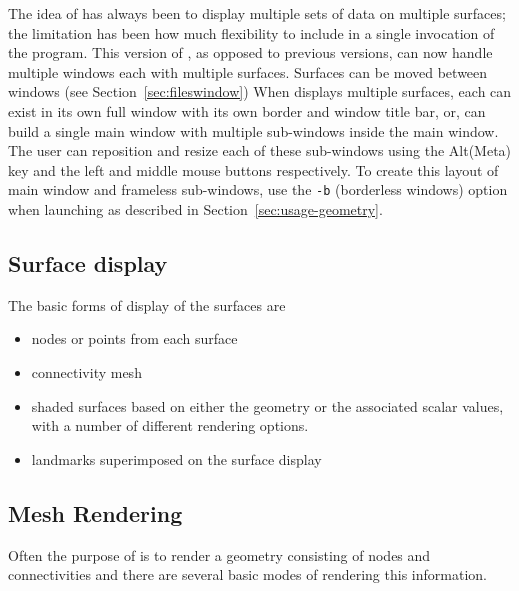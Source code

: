 The idea of \map{} has always been to display multiple sets of data on
multiple surfaces; the limitation has been how much flexibility to include
in a single invocation of the program.  This version of \map{}, as opposed
to previous versions, can now handle multiple windows each with multiple
surfaces.  Surfaces can be moved between windows (see
Section~\ref{sec:fileswindow}) When \map{} displays multiple surfaces, each
can exist in its own full window with its own border and window title bar,
or, \map{} can build a single main window with multiple sub-windows inside
the main window.  The user can reposition and resize each of these
sub-windows using the Alt(Meta) key and the left and middle mouse buttons
respectively.  To create this layout of main window and frameless
sub-windows, use the \texttt{-b} (borderless windows) option when launching
\map{} as described in Section~\ref{sec:usage-geometry}.


\subsection{Surface display }

The basic forms of display of the surfaces are
%
\begin{itemize}
  \item nodes or points from each surface
  \item connectivity mesh
  \item shaded surfaces based on either the geometry or the associated
        scalar values, with a number of different rendering options.
  \item landmarks superimposed on the surface display
\end{itemize}


\subsection{Mesh Rendering}
\label{sec:display-mesh} 

Often the purpose of \map{} is to render a geometry consisting of nodes and
connectivities and there are several basic modes of rendering this
information. 

